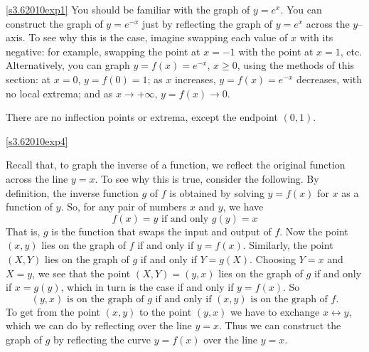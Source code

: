\begin{solution}
\eqref{s3.62010exp1}
You should be familiar with the graph of $y=e^x$. You can
           construct the graph of $y=e^{-x}$ just by reflecting the graph
           of $y=e^x$ across the $y$--axis. To see why this is the case,
           imagine swapping each value of $x$ with its negative: for example,
                      swapping the point at $x = -1$ with the point at $x = 1$, etc.
           Alternatively, you can graph $y=f(x)=e^{-x}$, $x\ge 0$,
           using the methods of this section: at $x=0$, $y=f(0)=1$;
           as $x$ increases, $y=f(x)=e^{-x}$ decreases, with no local
           extrema; and as $x\rightarrow+\infty$, $y=f(x)\rightarrow 0$.

There are no inflection points or extrema, except the endpoint $(0,1)$.

\begin{center}\end{center}

\eqref{s3.62010exp4}

Recall that, to graph the inverse of a function, we reflect the original function across the 
line $y=x$. To see why this is true, consider the following. By definition, the inverse function
$g$ of $f$ is obtained by solving $y=f(x)$ for $x$ as a function of $y$. So, for any pair of 
numbers $x$ and $y$, we have
 \begin{equation*}
              f(x) = y\text{ if and only  }g(y) = x
 \end{equation*}
 That is, $g$ is the function that swaps the input and output of $f$. Now the point $(x,y)$ 
 lies on the graph of $f$ if and only if $y=f(x)$. Similarly, the point $(X,Y)$ lies
 on the graph of $g$ if and only if $Y=g(X)$. Choosing $Y=x$ and $X=y$, we see that the point 
 $(X,Y)=(y,x)$ lies on the graph of $g$ if and only if $x=g(y)$, which in turn is the case
 if and only if $y=f(x)$. So
 \begin{equation*}
         \text{$(y,x)$ is on the graph of $g$ if and only
                      if $(x,y)$ is on the graph of $f$.}
 \end{equation*}
  To get from the point $(x,y)$ to the point $(y,x)$ we have to
  exchange $x \leftrightarrow y$, which we can do by reflecting
  over the line $y=x$.  Thus we can construct the graph of $g$
  by reflecting the curve $y = f(x)$ over the line  $y = x$.



\end{solution}
